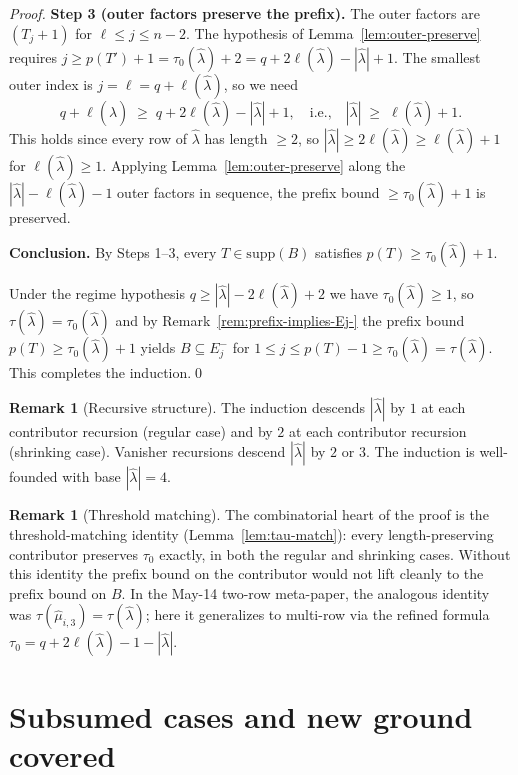 \documentclass[11pt]{article}
\theoremstyle{definition}
\newtheorem{remark}[theorem]{Remark}
\newcommand{\hatl}{\widehat\lambda}
\newcommand{\hatm}{\widehat\mu}
\newcommand{\supp}{\mathrm{supp}}
\newcommand{\elh}{\ell(\hatl)}
\begin{document}
\begin{proof}
\medskip\textbf{Step 3 (outer factors preserve the prefix).}
The outer factors are $(T_j + 1)$ for $\ell \le j \le n - 2$.  The
hypothesis of Lemma~\ref{lem:outer-preserve} requires $j \ge p(T') + 1
= \tau_0(\hatl) + 2 = q + 2\elh - |\hatl| + 1$.  The smallest outer
index is $j = \ell = q + \elh$, so we need
\[
   q + \elh \;\ge\; q + 2\elh - |\hatl| + 1,
   \quad\text{i.e.,}\quad
   |\hatl| \;\ge\; \elh + 1.
\]
This holds since every row of $\hatl$ has length $\ge 2$, so
$|\hatl| \ge 2\elh \ge \elh + 1$ for $\elh \ge 1$.\checkmark
Applying Lemma~\ref{lem:outer-preserve} along the $|\hatl| -
\elh - 1$ outer factors in sequence, the prefix bound $\ge
\tau_0(\hatl) + 1$ is preserved.

\medskip\textbf{Conclusion.}  By Steps 1--3, every $T \in \supp(B)$
satisfies $p(T) \ge \tau_0(\hatl) + 1$.
\medskip

Under the regime hypothesis $q \ge |\hatl| - 2\elh + 2$ we have
$\tau_0(\hatl) \ge 1$, so $\tau(\hatl) = \tau_0(\hatl)$ and by
Remark~\ref{rem:prefix-implies-Ej-} the prefix bound $p(T) \ge
\tau_0(\hatl) + 1$ yields $B \subseteq E_j^-$ for $1 \le j \le
p(T) - 1 \ge \tau_0(\hatl) = \tau(\hatl)$.  This completes the
induction.\qed
\end{proof}

\begin{remark}[Recursive structure]\label{rem:recursion-structure}
The induction descends $|\hatl|$ by $1$ at each contributor recursion
(regular case) and by $2$ at each contributor recursion (shrinking
case).  Vanisher recursions descend $|\hatl|$ by $2$ or $3$.  The
induction is well-founded with base $|\hatl| = 4$.
\end{remark}

\begin{remark}[Threshold matching]\label{rem:threshold-match}
The combinatorial heart of the proof is the threshold-matching
identity (Lemma~\ref{lem:tau-match}): every length-preserving
contributor preserves $\tau_0$ exactly, in both the regular and
shrinking cases.  Without this identity the prefix bound on the
contributor would not lift cleanly to the prefix bound on $B$.  In
the May-14 two-row meta-paper, the analogous identity was
$\tau(\hatm_{i,3}) = \tau(\hatl)$; here it generalizes to multi-row
via the refined formula $\tau_0 = q + 2\elh - 1 - |\hatl|$.
\end{remark}

\section{Subsumed cases and new ground covered}\label{sec:subsumed}
\end{document}
